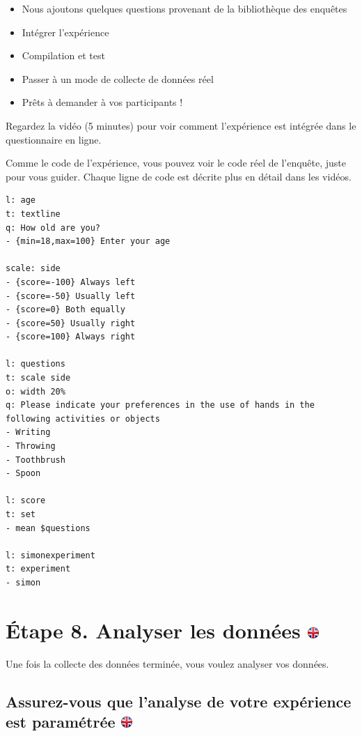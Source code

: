 \documentclass[
]{book}
\providecommand{\tightlist}{%
  \setlength{\itemsep}{0pt}\setlength{\parskip}{0pt}}
\begin{document}
\begin{itemize}
\tightlist
\item
  Nous ajoutons quelques questions provenant de la bibliothèque des enquêtes
\item
  Intégrer l'expérience
\item
  Compilation et test
\item
  Passer à un mode de collecte de données réel
\item
  Prêts à demander à vos participants !
\end{itemize}

Regardez la vidéo (5 minutes) pour voir comment l'expérience est intégrée dans le questionnaire en ligne.

Comme le code de l'expérience, vous pouvez voir le code réel de l'enquête, juste pour vous guider. Chaque ligne de code est décrite plus en détail dans les vidéos.

\begin{verbatim}
l: age
t: textline
q: How old are you?
- {min=18,max=100} Enter your age

scale: side
- {score=-100} Always left
- {score=-50} Usually left
- {score=0} Both equally
- {score=50} Usually right
- {score=100} Always right

l: questions
t: scale side
o: width 20%
q: Please indicate your preferences in the use of hands in the following activities or objects
- Writing
- Throwing
- Toothbrush
- Spoon

l: score
t: set
- mean $questions

l: simonexperiment
t: experiment
- simon
\end{verbatim}

\hypertarget{uxe9tape-8.-analyser-les-donnuxe9es}{%
\section[Étape 8. Analyser les données ]{\texorpdfstring{Étape 8. Analyser les données \href{https://www.psytoolkit.org/lessons/project.html\#_step_8_analyze_data}{\protect\includegraphics{img/ukflag.png}}}{Étape 8. Analyser les données }}\label{uxe9tape-8.-analyser-les-donnuxe9es}}

Une fois la collecte des données terminée, vous voulez analyser vos données.

\hypertarget{assurez-vous-que-lanalyse-de-votre-expuxe9rience-est-paramuxe9truxe9e}{%
\subsection[Assurez-vous que l'analyse de votre expérience est paramétrée ]{\texorpdfstring{Assurez-vous que l'analyse de votre expérience est paramétrée \href{https://www.psytoolkit.org/lessons/project.html\#_make_sure_your_experiment_analysis_is_set}{\protect\includegraphics{img/ukflag.png}}}{Assurez-vous que l'analyse de votre expérience est paramétrée }}\label{assurez-vous-que-lanalyse-de-votre-expuxe9rience-est-paramuxe9truxe9e}}
\end{document}
